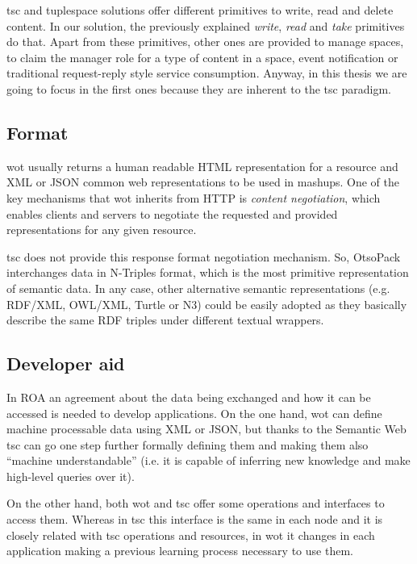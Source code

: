\ac{tsc} and tuplespace solutions offer different primitives to write, read and delete content. In our solution, the previously explained \textit{write},
\textit{read} and \textit{take} primitives do that. Apart from these primitives, other ones are provided to manage spaces, to claim the manager role
for a type of content in a space, event notification or traditional request-reply style service consumption. Anyway, in this thesis we are going to focus in the
first ones because they are inherent to the \ac{tsc} paradigm. %

\subsection{Format}
\ac{wot} usually returns a human readable HTML representation for a resource and XML or JSON common web representations to be used in mashups. One of the
key mechanisms that \ac{wot} inherits from HTTP is \textit{content negotiation}, which enables clients and servers to negotiate the requested and
provided representations for any given resource.

\ac{tsc} does not provide this response format negotiation mechanism. So, OtsoPack interchanges data in N-Triples format, which is the most primitive
representation of semantic data. In any case, other alternative semantic representations (e.g. RDF/XML, OWL/XML, Turtle or N3) could be
easily adopted as they basically describe the same RDF triples under different textual wrappers.

\subsection{Developer aid}%
In ROA an agreement about the data being exchanged and how it can be accessed is needed to develop applications.
On the one hand, \ac{wot} can define machine processable data using XML or JSON, but thanks to the Semantic Web \ac{tsc} can go one step
further formally defining them and making them also ``machine understandable'' (i.e. it is capable of inferring new knowledge and make
high-level queries over it).

On the other hand, both \ac{wot} and \ac{tsc} offer some operations and interfaces to access them. Whereas in \ac{tsc} this interface is the same in each node
and it is closely related with \ac{tsc} operations and resources, in \ac{wot} it changes in each application making a previous learning process necessary
to use them.

